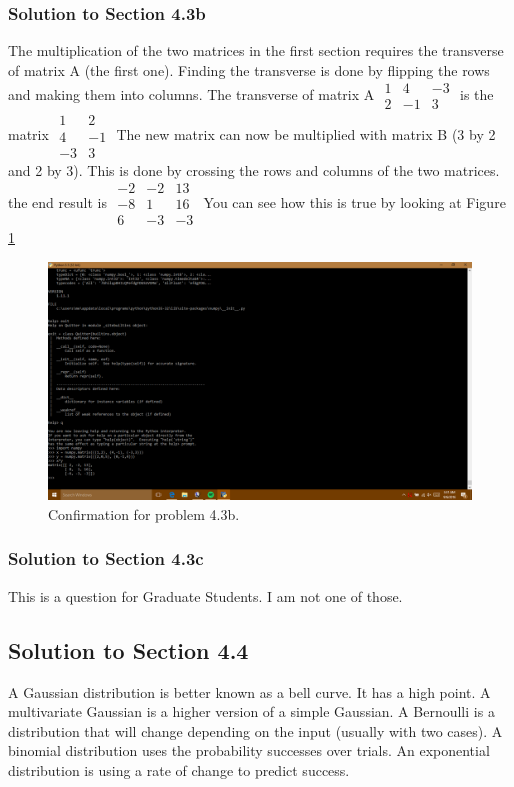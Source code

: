 \documentclass[a4paper]{article}
\begin{document}
\subsubsection{Solution to Section 4.3b}
The multiplication of the two matrices in the first section requires the transverse of matrix A (the first one). Finding the transverse is done by flipping the rows and making them into columns. The transverse of matrix A $\begin{matrix}
1 &4 &-3\\
2 &-1 &3
\end{matrix}$  is the matrix
$\begin{matrix}
1 & 2 \\
4 & -1\\
-3 & 3
\end{matrix}$ The new matrix can now be multiplied with matrix B (3 by 2 and 2 by 3). This is done by crossing the rows and columns of the two matrices. 
the end result is $\begin{matrix}-2 & -2 & 13\\
-8 & 1 & 16\\
6 & -3 & -3\end{matrix}$
You can see how this is true by looking at Figure \ref {fig:Matrix}

\begin{figure}
  \includegraphics[width=\linewidth]{Matrix.png}
  \caption{Confirmation for problem 4.3b.}
  \label {fig:Matrix}
\end{figure}
\subsubsection{Solution to Section 4.3c}
This is a question for Graduate Students. I am not one of those.

\subsection{Solution to Section 4.4}
A Gaussian distribution is better known as a bell curve. It has a high point. A multivariate Gaussian is a higher version of a simple Gaussian. A Bernoulli is a distribution that will change depending on the input (usually with two cases). A binomial distribution uses the probability successes over trials. An exponential distribution is using a rate of change to predict success.
\end{document}
